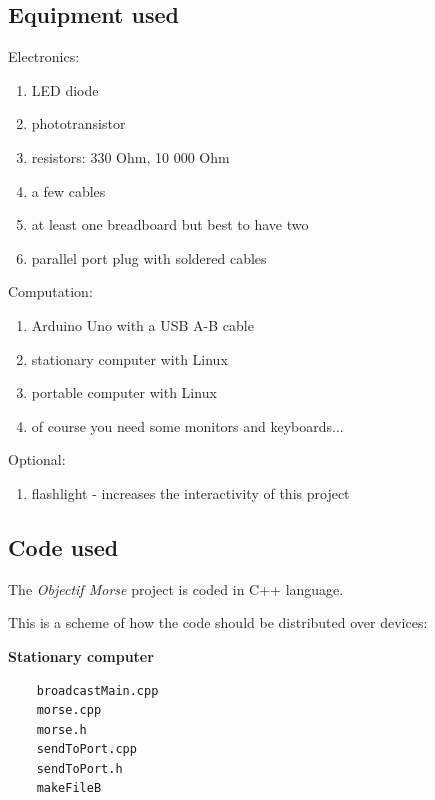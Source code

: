\documentclass[12pt]{report}
\begin{document}
\subsection{Equipment used} \label{sec:equip}

Electronics:

\begin{enumerate}

\item LED diode
\item phototransistor
\item resistors: 330 Ohm, 10 000 Ohm
\item a few cables
\item at least one breadboard but best to have two
\item parallel port plug with soldered cables

\end{enumerate}

Computation:

\begin{enumerate}

\item Arduino Uno with a USB A-B cable
\item stationary computer with Linux
\item portable computer with Linux
\item of course you need some monitors and keyboards...

\end{enumerate}

Optional:

\begin{enumerate}

\item flashlight - increases the interactivity of this project

\end{enumerate}

\newpage

\subsection{Code used}

The \textit{Objectif Morse} project is coded in C++ language.

This is a scheme of how the code should be distributed over devices:

\textbf{Stationary computer}

\begin{verbatim}
	broadcastMain.cpp
	morse.cpp
	morse.h
	sendToPort.cpp
	sendToPort.h
	makeFileB
\end{verbatim}
\end{document}
